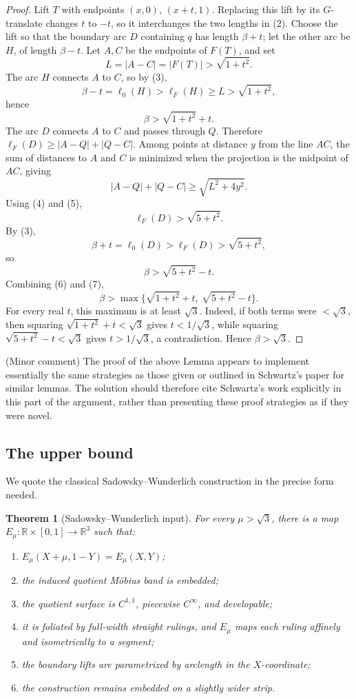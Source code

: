 \documentclass[12pt]{article}
\newcommand{\R}{\mathbb R}
\theoremstyle{plain}
\newtheorem{theorem}{Theorem}
\newcommand{\review}[1]{\begin{reviewbox}#1\end{reviewbox}}
\begin{document}
\begin{proof}
Lift \(T\) with endpoints \((x,0)\), \((x+t,1)\).  Replacing this lift by its
\(G\)-translate changes \(t\) to \(-t\), so it interchanges the two lengths in
(2).  Choose the lift so that the boundary arc \(D\) containing \(q\) has
length \(\beta+t\); let the other arc be \(H\), of length \(\beta-t\).  Let
\(A,C\) be the endpoints of \(F(T)\), and set
\[
L=|A-C|=|F(T)|>\sqrt{1+t^2}. \tag{5}
\]
The arc \(H\) connects \(A\) to \(C\), so by (3),
\[
\beta-t=\ell_0(H)>\ell_F(H)\ge L>\sqrt{1+t^2},
\]
hence
\[
\beta>\sqrt{1+t^2}+t. \tag{6}
\]
The arc \(D\) connects \(A\) to \(C\) and passes through \(Q\).  Therefore
\(\ell_F(D)\ge |A-Q|+|Q-C|\).  Among points at distance \(y\) from the line
\(AC\), the sum of distances to \(A\) and \(C\) is minimized when the
projection is the midpoint of \(AC\), giving
\[
|A-Q|+|Q-C|\ge \sqrt{L^2+4y^2}.
\]
Using (4) and (5),
\[
\ell_F(D)>\sqrt{5+t^2}.
\]
By (3),
\[
\beta+t=\ell_0(D)>\ell_F(D)>\sqrt{5+t^2},
\]
so
\[
\beta>\sqrt{5+t^2}-t. \tag{7}
\]
Combining (6) and (7),
\[
\beta>
\max\{\sqrt{1+t^2}+t,\ \sqrt{5+t^2}-t\}.
\]
For every real \(t\), this maximum is at least \(\sqrt3\).  Indeed, if both
terms were \(<\sqrt3\), then squaring
\(\sqrt{1+t^2}+t<\sqrt3\) gives \(t<1/\sqrt3\), while squaring
\(\sqrt{5+t^2}-t<\sqrt3\) gives \(t>1/\sqrt3\), a contradiction.  Hence
\(\beta>\sqrt3\).
\end{proof}

\review{(Minor comment) The proof of the above Lemma appears to implement essentially the same strategies as those given or outlined in Schwartz's paper for similar lemmas. The solution should therefore cite Schwartz's work explicitly in this part of the argument, rather than presenting these proof strategies as if they were novel.}

\subsection{The upper bound}

We quote the classical Sadowsky--Wunderlich construction in the precise form
needed.

\begin{theorem}[Sadowsky--Wunderlich input]\label{thm:sadowsky}
For every \(\mu>\sqrt3\), there is a map
\(E_\mu:\R\times[0,1]\to\R^3\) such that:
\begin{enumerate}
\item \(E_\mu(X+\mu,1-Y)=E_\mu(X,Y)\);
\item the induced quotient M\"obius band is embedded;
\item the quotient surface is \(C^{1,1}\), piecewise \(C^\infty\), and
developable;
\item it is foliated by full-width straight rulings, and \(E_\mu\) maps each
ruling affinely and isometrically to a segment;
\item the boundary lifts are parametrized by arclength in the \(X\)-coordinate;
\item the construction remains embedded on a slightly wider strip.
\end{enumerate}
\end{theorem}
\end{document}
